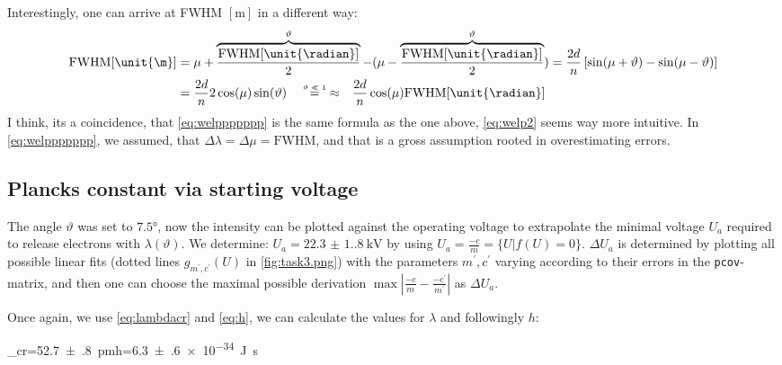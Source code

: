 Interestingly, one can arrive at FWHM \([\unit{\m}]\) in a different way:
\begin{align}
    \text{FWHM}[\unit{\m}]&=\mu+\overbrace{\frac{\text{FWHM}[\unit{\radian}]}{2}}^{\vartheta}-(\mu-\overbrace{\frac{\text{FWHM}[\unit{\radian}]}{2}}^{\vartheta})=\frac{2d}{n}\left[\sin(\mu+\vartheta)-\sin(\mu-\vartheta)\right]\\
    &=\frac{2d}{n}2\cos(\mu)\sin(\vartheta)\quad\mytexteq{\(\vartheta\ll 1\)}{}{\approx}\quad\frac{2d}{n}\cos(\mu)\text{FWHM}[\unit{\radian}]\label{eq:welp2}
\end{align} 
I think, its a coincidence, that \cref{eq:welppppppp} is the same formula as the one above, \cref{eq:welp2} seems way more intuitive. In \cref{eq:welppppppp}, we assumed, that \(\Delta\lambda=\Delta\mu=\text{FWHM}\), and that is a gross assumption rooted in overestimating errors.
\clearpage

\subsection{Plancks constant via starting voltage}
The angle \(\vartheta\) was set to \(\ang{7.5}\), now the intensity can be plotted against the operating voltage to extrapolate the minimal voltage \(U_a\) required to release electrons with \(\lambda(\vartheta)\). We determine: \(U_a=\qty{22.3(1.8)}{\kilo\volt}\) by using \(U_a=\frac{-c}{m}=\{U|f(U)=0\}\). \(\Delta U_a\) is determined by plotting all possible linear fits (dotted lines \(g_{m^\prime,c^\prime}(U)\) in \cref{fig:task3.png}) with the parameters \(m^\prime,c^\prime\) varying according to their errors in the \verb|pcov|-matrix, and then one can choose the maximal possible derivation \(\max|\frac{-c}{m}-\frac{-c^\prime}{m^\prime}|\) as \(\Delta U_a\). 

Once again, we use \cref{eq:lambdacr} and \cref{eq:h}, we can calculate the values for \(\lambda\) and followingly \(h\):
\begin{rb}
    \lambda_{cr}=\qty{52.7(8)}{\pico\m}\quad\quad h=\qty{6.3(6)e-34}{\joule\s}
\end{rb}
\clearpage

